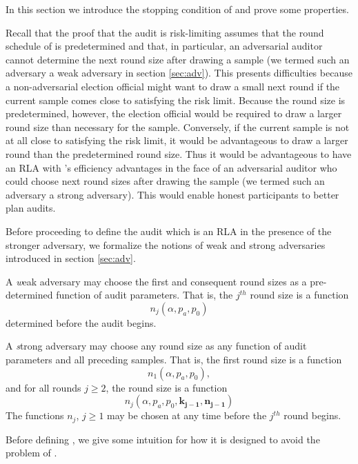 In this section we introduce the stopping condition of \Providence and prove some properties.

Recall that the proof that the \Minerva audit is risk-limiting assumes that the round schedule of \Minerva is predetermined and that, in particular, an adversarial auditor cannot determine the next round size after drawing a sample (we termed such an adversary a weak adversary in section \ref{sec:adv}). This presents difficulties because a non-adversarial election official might want to draw a small next round if the current sample comes close to satisfying the risk limit. Because the \Minerva round size is predetermined, however, the election official would be required to draw a larger round size than necessary for the sample. Conversely, if the current sample is not at all close to satisfying the risk limit, it would be advantageous to draw a larger round than the predetermined round size. Thus it would be advantageous to have an RLA with \Minerva's efficiency advantages in the face of an adversarial auditor who could choose next round sizes after drawing the sample (we termed such an adversary a strong adversary). This would enable honest participants to better plan audits. 

Before proceeding to define the audit \Providence which is an RLA in the presence of the stronger adversary, we formalize the notions of weak and strong adversaries introduced in section \ref{sec:adv}.

\begin{definition}
A {\emph weak adversary} may choose the first and consequent round sizes as a pre-determined function of audit parameters. That is, the $j^{th}$ round size is a function $$n_j(\alpha, p_a, p_0)$$ determined before the audit begins. 
\end{definition}

\begin{definition}
A {\emph strong adversary} may choose any round size as any function of audit parameters and all preceding samples. That is, the first round size is a function 
$$n_1(\alpha, p_a, p_0),$$
and for all rounds $j\ge 2$, the round size is a function
$$n_{j}(\alpha, p_a, p_0, \bm{k_{j-1}}, \bm{n_{j-1}})$$ The functions $n_j$, $j \geq 1$ may be chosen at any time before the $j^{th}$ round begins. 
\end{definition}

Before defining \Providence, we give some intuition for how it is designed to avoid the problem of \Minerva.

